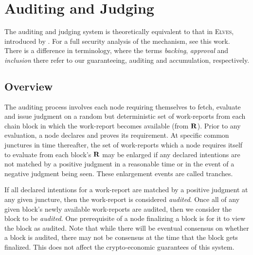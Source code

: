 \section{Auditing and Judging}\label{sec:auditing}

The auditing and judging system is theoretically equivalent to that in \textsc{Elves}, introduced by \cite{cryptoeprint:2024/961}. For a full security analysis of the mechanism, see this work. There is a difference in terminology, where the terms \emph{backing}, \emph{approval} and \emph{inclusion} there refer to our guaranteeing, auditing and accumulation, respectively.


\subsection{Overview}

The auditing process involves each node requiring themselves to fetch, evaluate and issue judgment on a random but deterministic set of work-reports from each \Jam chain block in which the work-report becomes available (\ie from $\mathbf{R}$). Prior to any evaluation, a node declares and proves its requirement. At specific common junctures in time thereafter, the set of work-reports which a node requires itself to evaluate from each block's $\mathbf{R}$ may be enlarged if any declared intentions are not matched by a positive judgment in a reasonable time or in the event of a negative judgment being seen. These enlargement events are called tranches.

If all declared intentions for a work-report are matched by a positive judgment at any given juncture, then the work-report is considered \emph{audited}. Once all of any given block's newly available work-reports are audited, then we consider the block to be \emph{audited}. One prerequisite of a node finalizing a block is for it to view the block as audited. Note that while there will be eventual consensus on whether a block is audited, there may not be consensus at the time that the block gets finalized. This does not affect the crypto-economic guarantees of this system.

